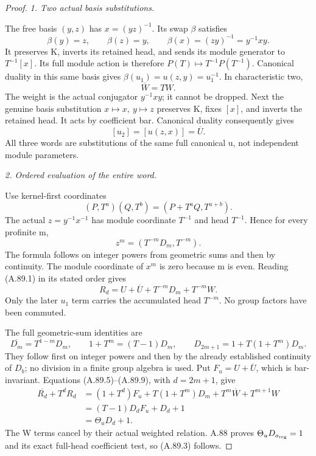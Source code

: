 \begin{proof}
\emph{1. Two actual basis substitutions.}\par
The free basis \((y,z)\) has \(x=(yz)^{-1}\). Its swap \(\beta\) satisfies
\[
 \beta(y)=z,\qquad \beta(z)=y,\qquad
 \beta(x)=(zy)^{-1}=y^{-1}xy.
\]
It preserves K, inverts its retained head, and sends its module
generator to \(T^{-1}[x]\). Its full module action is therefore
\(P(T)\mapsto T^{-1}P(T^{-1})\). Canonical duality in this same
basis gives \(\beta(u_1)=u(z,y)=u_1^{-1}\). In characteristic two,
\[
                         \overline W=TW.
 \tag{A.89.5}
\]
The weight is the actual conjugator \(y^{-1}xy\); it cannot be dropped.
Next the genuine basis substitution \(x\mapsto x,\ y\mapsto z\)
preserves K, fixes \([x]\), and inverts the retained head. It acts
by coefficient bar. Canonical duality consequently gives
\[
                  [u_2]=[u(z,x)]=\overline U.
 \tag{A.89.6}
\]
All three words are substitutions of the same full canonical u,
not independent module parameters.

\emph{2. Ordered evaluation of the entire word.}\par
Use kernel-first coordinates
\[
 (P,T^a)(Q,T^b)=(P+T^aQ,T^{a+b}).
\]
The actual \(z=y^{-1}x^{-1}\) has module coordinate \(T^{-1}\)
and head \(T^{-1}\). Hence for every profinite m,
\[
                 z^m=(T^{-m}D_m,T^{-m}).
 \tag{A.89.7}
\]
The formula follows on integer powers from geometric sums and
then by continuity. The module coordinate of \(x^m\) is zero
because m is even. Reading (A.89.1) in its stated order gives
\[
 R_d=U+\overline U+T^{-m}D_m+T^{-m}W.
 \tag{A.89.8}
\]
Only the later \(u_1\) term carries the accumulated head \(T^{-m}\).
No group factors have been commuted.

The full geometric-sum identities are
\[
 \overline{D_m}=T^{1-m}D_m,\qquad
 1+T^m=(T-1)D_m,\qquad
 D_{2m+1}=1+T(1+T^m)D_m.
 \tag{A.89.9}
\]
They follow first on integer powers and then by the already
established continuity of \(D_b\); no division in a finite group
algebra is used. Put \(F_u=U+\overline U\), which is bar-invariant.
Equations (A.89.5)--(A.89.9), with \(d=2m+1\), give
\[
 \begin{aligned}
 \overline{R_d}+T^dR_d
  &=(1+T^d)F_u+T(1+T^m)D_m
        +T^m\overline W+T^{m+1}W\\
  &=(T-1)D_dF_u+D_d+1\\
  &=\Theta_uD_d+1.
 \end{aligned}
 \tag{A.89.10}
\]
The W terms cancel by their actual weighted relation.
A.88 proves \(\Theta_uD_{a_{\rm reg}}=1\) and its exact
full-head coefficient test, so (A.89.3) follows.


\end{proof}

